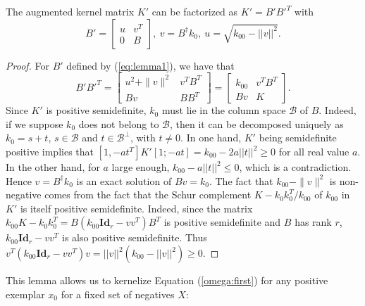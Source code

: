 \begin{lemma} The augmented kernel matrix $K'$ can be factorized as $K'= B'B'^T$ with
\begin{equation}
B'=\begin{bmatrix}
u & v^T\\0 & B
\end{bmatrix},~
v = B^\dagger k_0,~ u=\sqrt{k_{00}-||v||^2}.
\label{eq:lemma1}
\end{equation}
\end{lemma}\label{lemma1}
\begin{proof}
For $B'$ defined by (\ref{eq:lemma1}), we have that
\begin{equation}
B'B'^T = 
\begin{bmatrix} u^2+\|v\|^2 & v^TB^T\\ 
Bv& BB^T\end{bmatrix} 
=\begin{bmatrix} k_{00} & v^TB^T\\ 
Bv& K\end{bmatrix} .
\end{equation}
Since $K'$ is positive semidefinite, $k_0$ must lie in the column space $\mathcal{B}$ of $B$.
Indeed, if we suppose $k_0$ does not belong to $\mathcal{B}$, then it can be decomposed uniquely as $k_0=s+t$, $s\in\mathcal{B}$ and  $t\in\mathcal{B}^\perp$, with $t\ne 0$. In one hand, $K'$ being semidefinite positive implies that $[1, -at^T]K'[1; -at]=k_{00}-2a||t||^2\ge 0$ for all real value $a$. In the other hand, for $a$ large enough, $k_{00}-a||t||^2\le 0$, which is a contradiction.
Hence $v=B^\dagger k_0$ is an exact solution of $Bv=k_0$. The fact that $k_{00}-\|v\|^2$ is non-negative comes from the fact that the Schur complement $K-k_0 k_0^T / k_{00}$ of $k_{00}$ in $K'$ is itself positive semidefinite.
Indeed, since the matrix $k_{00}K-k_0k_0^T=B(k_{00}\textbf{Id}_r-vv^T)B^T$ is positive semidefinite and $B$ has rank $r$, $k_{00}\textbf{Id}_r-vv^T$ is also positive semidefinite. Thus $v^T(k_{00}\textbf{Id}_r-vv^T)v = ||v||^2(k_{00}-||v||^2)\ge 0$.
\end{proof}
This lemma allows us to kernelize Equation (\ref{omega:first}) for any positive exemplar $x_0$ for a fixed set of negatives $X$:
